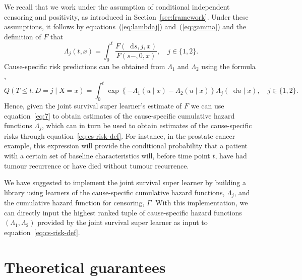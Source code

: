 \documentclass[lineno]{biometrika}
\newcommand*\diff{\mathop{}\!\mathrm{d}}
\newcommand{\1}{\mathds{1}}
\begin{document}
We recall that we work under the assumption of conditional independent
censoring and positivity, as introduced in
Section~\ref{sec:framework}. Under these assumptions, it follows by
equations~(\ref{eq:lambdaj}) and~(\ref{eq:gamma}) and the definition
of \( F \) that
\begin{equation}
  \label{eq:7}
  \Lambda_j(t , x) 
  = \int_0^t  \frac{F(\diff s, j, x )}{F(s-, 0, x )},
  \quad j \in \{1,2\}.
\end{equation}
Cause-specific risk predictions can be obtained from \( \Lambda_1 \)
and $\Lambda_2$ using the formula
\citep[e.g.,][]{benichou1990estimates, ozenne2017riskregression},
\begin{equation}
  \label{eq:cs-risk-def}
  Q(T \leq t, D = j \mid X=x) =
  \int_0^t \exp\left\{-\Lambda_{1}(u \mid x)-\Lambda_{2}(u
    \mid x)\right\}  \Lambda_j(\diff u \mid x),
  \quad j \in \{1,2\}.
\end{equation}
Hence, given the joint survival super learner's estimate of \( F \) we
can use equation~\eqref{eq:7} to obtain estimates of the
cause-specific cumulative hazard functions $\Lambda_j$, which can in
turn be used to obtain estimates of the cause-specific risks through
equation~\eqref{eq:cs-risk-def}. For instance, in the prostate cancer
example, this expression will provide the conditional probability that
a patient with a certain set of baseline characteristics will, before
time point \( t \), have had tumour recurrence or have died without
tumour recurrence.

We have suggested to implement the joint survival super learner by building a library
using learners of the cause-specific cumulative hazard functions,
$\Lambda_j$, and the cumulative hazard function for censoring,
$\Gamma$. With this implementation, we can directly input the highest
ranked tuple of cause-specific hazard functions
$(\Lambda_1, \Lambda_2)$ provided by the joint survival super learner as input to
equation~\eqref{eq:cs-risk-def}.

\section{Theoretical guarantees}
\label{sec:theor-results-prop}
\end{document}
